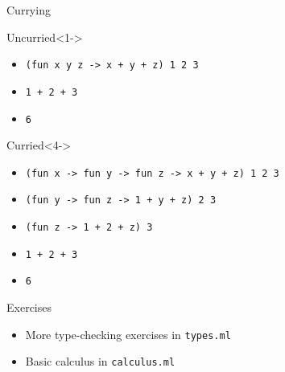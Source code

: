 \documentclass{beamer}
\newcommand{\code}[1]{\texttt{#1}}
\begin{document}
    \begin{frame}{Currying}
        \begin{block}{Uncurried}<1->
            \begin{itemize}
                \item<1-> \code{(fun x y z -> x + y + z) 1 2 3}
                \item<2-> \code{1 + 2 + 3}
                \item<3-> \code{6}
            \end{itemize}
        \end{block}

        \begin{block}{Curried}<4->
            \begin{itemize}
                \item<4-> \code{(fun x -> fun y -> fun z -> x + y + z) 1 2 3} 
                \item<5-> \code{(fun y -> fun z -> 1 + y + z) 2 3}
                \item<6-> \code{(fun z -> 1 + 2 + z) 3}
                \item<7-> \code{1 + 2 + 3}
                \item<8-> \code{6}
            \end{itemize} 
        \end{block}
    \end{frame}

    \begin{frame}{Exercises}
        \begin{itemize}
            \item<1-> More type-checking exercises in \texttt{types.ml}
            \item<2-> Basic calculus in \texttt{calculus.ml}
        \end{itemize}
    \end{frame}
\end{document}
